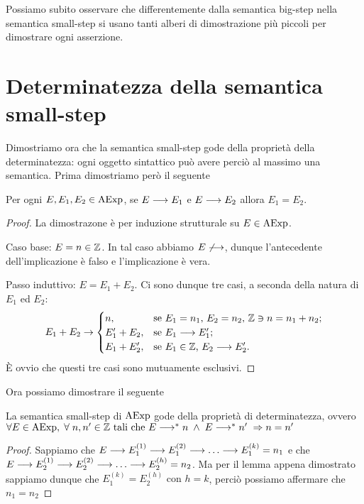 Possiamo subito osservare che differentemente dalla semantica big-step
nella semantica small-step si usano tanti alberi di dimostrazione più piccoli per dimostrare
ogni asserzione.

\section{Determinatezza della semantica small-step} 
Dimostriamo ora che la semantica small-step gode della proprietà della
determinatezza: ogni oggetto sintattico può avere perciò al massimo
una semantica. Prima dimostriamo però il seguente

\begin{teorema}
Per ogni $E, E_1, E_2 \in \mathrm{AExp}$, se $E \longrightarrow E_1$ e $E \longrightarrow E_2$
allora $E_1 = E_2$.
\end{teorema}

\begin{proof}
La dimostrazone è per induzione strutturale su $E \in \mathrm{AExp}$.

Caso base: $E = n \in \mathbb{Z}$.
In tal caso abbiamo $E \not \longrightarrow$, dunque l'antecedente dell'implicazione
è falso e l'implicazione è vera.

Passo induttivo: $E = E_1 + E_2$.
Ci sono dunque tre casi, a seconda della natura di $E_1$ ed $E_2$:
\[
  E_1 + E_2
    \rightarrow
      \begin{cases}
        n,          &\text{se $E_1 = n_1$, $E_2 = n_2$,
                           $\mathbb{Z} \ni n = n_1 + n_2$;} \\
        E_1' + E_2, &\text{se $E_1 \longrightarrow E_1'$;} \\
        E_1 + E_2', &\text{se $E_1 \in \mathbb{Z}$, $E_2 \longrightarrow E_2'$.}
      \end{cases}
\]
È ovvio che questi tre casi sono mutuamente esclusivi.
\end{proof}

Ora possiamo dimostrare il seguente

\begin{teorema}[Determinatezza]
La semantica small-step di $\mathrm{AExp}$ gode della proprietà di determinatezza, ovvero
$\forall E \in \mathrm{AExp}, \; \forall \; n, n' \in \mathbb{Z} \text{ tali che } E \longrightarrow ^* n \; \land \; E \longrightarrow ^* n' \; \Rightarrow n = n'$
\end{teorema}

\begin{proof}
Sappiamo che $E \ssarrow E_1^{(1)} \ssarrow E_1^{(2)} \ssarrow \dots \ssarrow E_1^{(k)} = n_1$ e che $E \ssarrow E_2^{(1)} \ssarrow E_2^{(2)} \ssarrow \dots \ssarrow E_2^{(h)} = n_2$.
Ma per il lemma appena dimostrato sappiamo dunque che $E_1^{(k)} = E_2^{(h)} \text{ con } h = k$, perciò possiamo affermare che $n_1 = n_2$
\end{proof}

